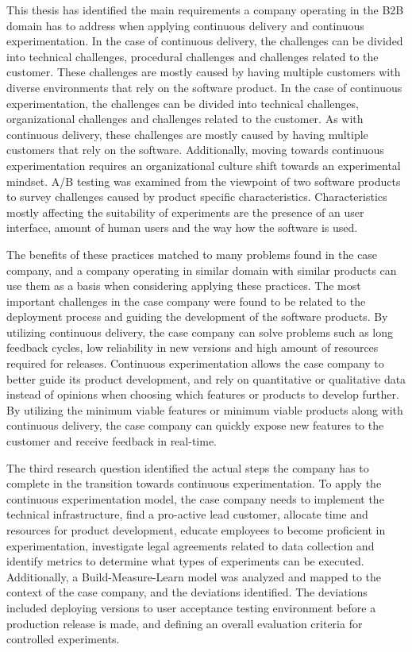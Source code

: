 \documentclass[english]{tktltiki2}
\theoremstyle{definition}
\theoremstyle{remark}
\begin{document}
This thesis has identified the main requirements a company operating in the B2B domain has to address when applying continuous delivery and continuous experimentation. In the case of continuous delivery, the challenges can be divided into technical challenges, procedural challenges and challenges related to the customer. These challenges are mostly caused by having multiple customers with diverse environments that rely on the software product. In the case of continuous experimentation, the challenges can be divided into technical challenges, organizational challenges and challenges related to the customer. As with continuous delivery, these challenges are mostly caused by having multiple customers that rely on the software. Additionally, moving towards continuous experimentation requires an organizational culture shift towards an experimental mindset. A/B testing was examined from the viewpoint of two software products to survey challenges caused by product specific characteristics. Characteristics mostly affecting the suitability of experiments are the presence of an user interface, amount of human users and the way how the software is used.

The benefits of these practices matched to many problems found in the case company, and a company operating in similar domain with similar products can use them as a basis when considering applying these practices. The most important challenges in the case company were found to be related to the deployment process and guiding the development of the software products. By utilizing continuous delivery, the case company can solve problems such as long feedback cycles, low reliability in new versions and high amount of resources required for releases. Continuous experimentation allows the case company to better guide its product development, and rely on quantitative or qualitative data instead of opinions when choosing which features or products to develop further. By utilizing the minimum viable features or minimum viable products along with continuous delivery, the case company can quickly expose new features to the customer and receive feedback in real-time.

The third research question identified the actual steps the company has to complete in the transition towards continuous experimentation. To apply the continuous experimentation model, the case company needs to implement the technical infrastructure, find a pro-active lead customer, allocate time and resources for product development, educate employees to become proficient in experimentation, investigate legal agreements related to data collection and identify metrics to determine what types of experiments can be executed. Additionally, a Build-Measure-Learn model \cite{fagerholm2014building} was analyzed and mapped to the context of the case company, and the deviations identified. The deviations included deploying versions to user acceptance testing environment before a production release is made, and defining an overall evaluation criteria for controlled experiments. 
\end{document}
